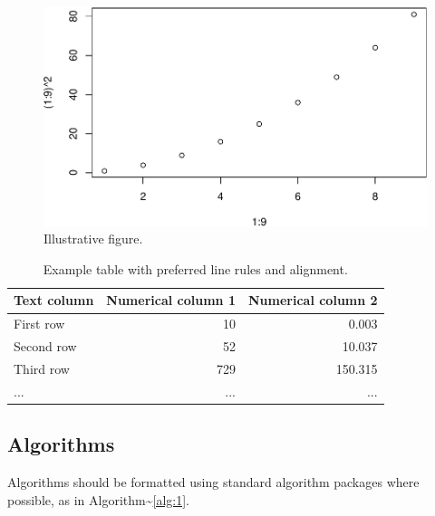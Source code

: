 \documentclass{josis}
\begin{document}
\begin{figure}
\centering
\includegraphics{Untitled_files/figure-latex/fig1-1.pdf}
\caption{Illustrative figure.}
\end{figure}

\begin{table}
\centering
\begin{tabular}{lrr}
\hline
Text column & Numerical column 1 & Numerical column 2\\
\hline
First row& 10 & 0.003\\
Second row& 52& 10.037\\
Third row& 729 & 150.315\\
...& ...& ...\\
\hline
\end{tabular}
\caption{Example table with preferred line rules and alignment.}\label{tab:1}
\end{table}

\subsection{Algorithms}

Algorithms should be formatted using standard algorithm packages where
possible, as in Algorithm\textasciitilde{}\ref{alg:1}.
\end{document}
